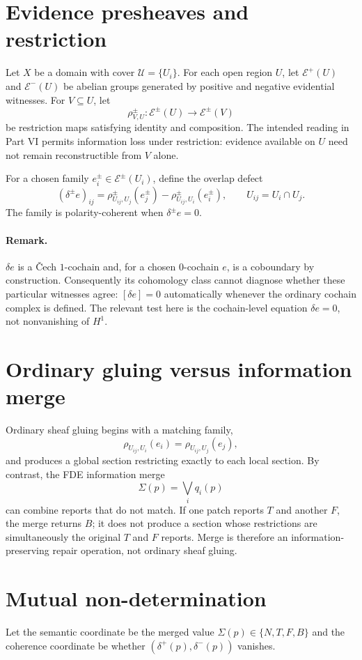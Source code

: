 \section*{Evidence presheaves and restriction}
Let $X$ be a domain with cover $\mathcal U=\{U_i\}$. For each open region $U$, let $\mathcal E^+(U)$ and $\mathcal E^-(U)$ be abelian groups generated by positive and negative evidential witnesses. For $V\subseteq U$, let
\[
\rho_{V,U}^{\pm}:\mathcal E^{\pm}(U)\to\mathcal E^{\pm}(V)
\]
be restriction maps satisfying identity and composition. The intended reading in Part VI permits information loss under restriction: evidence available on $U$ need not remain reconstructible from $V$ alone.

For a chosen family $e_i^\pm\in\mathcal E^\pm(U_i)$, define the overlap defect
\[
(\delta^\pm e)_{ij}
=
\rho_{U_{ij},U_j}^{\pm}(e_j^\pm)
-
\rho_{U_{ij},U_i}^{\pm}(e_i^\pm),
\qquad U_{ij}=U_i\cap U_j.
\]
The family is polarity-coherent when $\delta^\pm e=0$.

\paragraph{Remark.}
$\delta e$ is a \v{C}ech $1$-cochain and, for a chosen $0$-cochain $e$, is a coboundary by construction. Consequently its cohomology class cannot diagnose whether these particular witnesses agree: $[\delta e]=0$ automatically whenever the ordinary cochain complex is defined. The relevant test here is the cochain-level equation $\delta e=0$, not nonvanishing of $H^1$.

\section*{Ordinary gluing versus information merge}
Ordinary sheaf gluing begins with a matching family,
\[
\rho_{U_{ij},U_i}(e_i)=\rho_{U_{ij},U_j}(e_j),
\]
and produces a global section restricting exactly to each local section. By contrast, the FDE information merge
\[
\Sigma(p)=\bigvee_i q_i(p)
\]
can combine reports that do not match. If one patch reports $T$ and another $F$, the merge returns $B$; it does not produce a section whose restrictions are simultaneously the original $T$ and $F$ reports. Merge is therefore an information-preserving repair operation, not ordinary sheaf gluing.

\section*{Mutual non-determination}
Let the semantic coordinate be the merged value $\Sigma(p)\in\{N,T,F,B\}$ and the coherence coordinate be whether $(\delta^+(p),\delta^-(p))$ vanishes.

